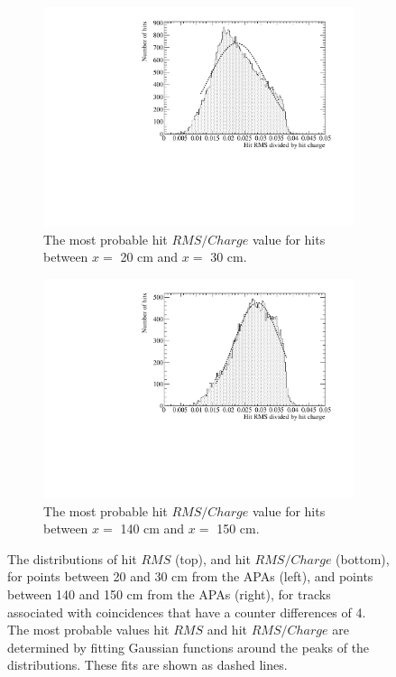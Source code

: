 \begin{figure}[h!]
\begin{subfigure}{0.48\textwidth}
    \includegraphics[width=\textwidth]{DataCan_2}
    \caption{The most probable hit $RMS/Charge$ value for hits between $x =$ 20 cm and $x =$ 30 cm.}
  \end{subfigure}%
  \hspace{0.03\textwidth}%
  \begin{subfigure}{0.48\textwidth}
    \centering
    \includegraphics[width=\textwidth]{DataCan_3}
    \caption{The most probable hit $RMS/Charge$ value for hits between $x =$ 140 cm and $x =$ 150 cm.}
  \end{subfigure}
  \caption[The most probable values of the $RMS$ and $RMS/Charge$ distributions for tracks with a counter difference of 4 in the 35 ton data]
          {The distributions of hit $RMS$ (top), and hit $RMS/Charge$ (bottom), for points between 20 and 30 cm from the APAs (left), and points between 140 and 150 cm from the APAs (right), for tracks associated with coincidences that have a counter differences of 4. The most probable values hit $RMS$ and hit $RMS/Charge$ are determined by fitting Gaussian functions around the peaks of the distributions. These fits are shown as dashed lines.}
          \label{fig:DiffDataHitFit}
\end{figure}

